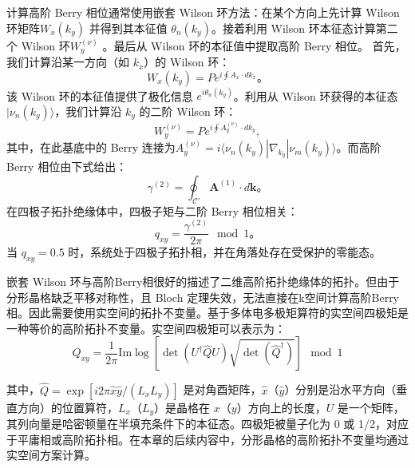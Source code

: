 计算高阶 Berry 相位通常使用嵌套 Wilson 环方法：在某个方向上先计算 Wilson 环矩阵$W_x(k_y)$ 并得到其本征值 $\theta_n(k_y)$。接着利用 Wilson 环本征态计算第二个 Wilson 环$W_y^{(\nu)}$ 。最后从 Wilson 环的本征值中提取高阶 Berry 相位。 首先，我们计算沿某一方向（如 \( k_x \)）的 Wilson 环：
\begin{equation}
    W_x(k_y) = P e^{i \oint A_x \cdot dk_x}。
\end{equation}
该 Wilson 环的本征值提供了极化信息 $e^{i\theta_n(k_y)}$。利用从 Wilson 环获得的本征态 \( |\nu_n(k_y)\rangle \)，我们计算沿 \( k_y \) 的二阶 Wilson 环：
\begin{equation}
    W_y^{(\nu)} = P e^{i \oint A_y^{(\nu)} \cdot dk_y},
\end{equation}
其中，在此基底中的 Berry 连接为$A_y^{(\nu)} = i \langle \nu_n(k_y) | \nabla_{k_y} | \nu_m(k_y) \rangle$。而高阶 Berry 相位由下式给出：
\begin{equation}
    \gamma^{(2)} = \oint_{\mathcal{C}'} \mathbf{A}^{(1)} \cdot d\mathbf{k}。
\end{equation}
在四极子拓扑绝缘体中，四极子矩与二阶 Berry 相位相关：
\begin{equation}
    q_{xy} = \frac{ \gamma^{(2)}}{2\pi}  \mod 1。
\end{equation}
当 \( q_{xy} = 0.5 \) 时，系统处于四极子拓扑相，并在角落处存在受保护的零能态。

嵌套 Wilson 环与高阶Berry相很好的描述了二维高阶拓扑绝缘体的拓扑。但由于分形晶格缺乏平移对称性，且 Bloch 定理失效，无法直接在k空间计算高阶Berry相。因此需要使用实空间的拓扑不变量。基于多体电多极矩算符的实空间四极矩\cite{wheeler2019many,kang2019many}是一种等价的高阶拓扑不变量。实空间四极矩可以表示为：
\begin{equation}
Q_{xy} = \frac{1}{2\pi} \text{Im} \log \left[ \det \left( U^\dagger \hat{Q} U \right)\sqrt{\det \left(\hat{Q}^\dagger \right)} \right] \mod 1
\end{equation}

其中，\( \hat{Q} = \exp \left[i 2\pi \hat{x} \hat{y}/(L_x L_y) \right] \) 是对角酉矩阵，\( \hat{x} \)（\( \hat{y} \)）分别是沿水平方向（垂直方向）的位置算符，\( L_x \)（\( L_y \)）是晶格在 \( x \)（\( y \)）方向上的长度，\( U \) 是一个矩阵，其列向量是哈密顿量在半填充条件下的本征态。四极矩被量子化为 0 或 1/2，对应于平庸相或高阶拓扑相。在本章的后续内容中，分形晶格的高阶拓扑不变量均通过实空间方案计算。


